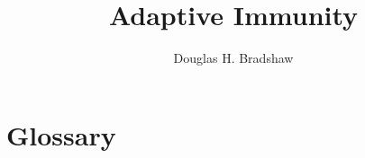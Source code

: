 \documentclass[letterpaper,twoside,12pt]{scrbook}
\begin{document}
\title{Adaptive Immunity}
\author{Douglas H. Bradshaw}
\frontmatter
\maketitle
\tableofcontents
\mainmatter
\chapter{Glossary}
\end{document}
